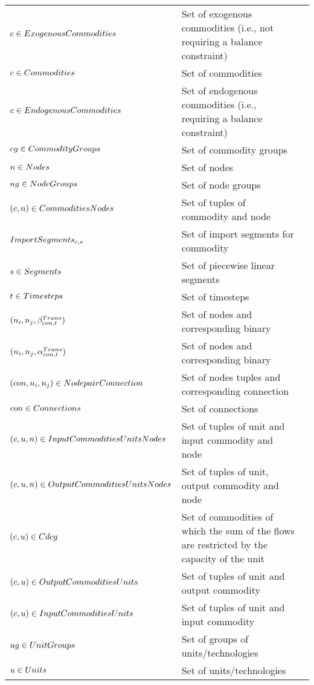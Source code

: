 	\begin{longtable}{p{\cola} p{\colc} >{\small\raggedleft\arraybackslash\itshape}p{\colb}}
		$c \in ExogenousCommodities$	& Set of exogenous commodities (i.e., not requiring a balance constraint)	&                \\
		$c \in Commodities   $	& Set of commodities                                          	&                \\
		$c \in EndogenousCommodities$	& Set of endogenous commodities (i.e., requiring a balance constraint)	&                \\
		$cg \in CommodityGroups$	& Set of commodity groups                                     	&                \\
		$n \in Nodes         $	& Set of nodes                                                	&                \\
		$ng \in NodeGroups    $	& Set of node groups                                          	&                \\
		$(c, n) \in CommoditiesNodes$	& Set of tuples of commodity and node                         	&                \\
		$ImportSegments_{c,s}$	& Set of import segments \segment for commodity \commodity    	&                \\
		$s \in Segments      $	& Set of piecewise linear segments                            	&                \\
		$t \in Timesteps     $	& Set of timesteps                                            	&                \\
		$(n_i,n_j,\beta^{Trans}_{{con},t})       $	& Set of nodes and corresponding binary                       	&                \\
		$(n_i,n_j,\alpha^{Trans}_{{con},t})      $	& Set of nodes and corresponding binary                       	&                \\
		$({con},n_i,n_j) \in NodepairConnection$	& Set of nodes tuples and corresponding connection            	&                \\
		${con} \in Connections   $	& Set of connections                                          	&                \\
		$(c, u, n) \in InputCommoditiesUnitsNodes$	& Set of tuples of unit and input commodity and node          	&                \\
		$(c, u, n) \in OutputCommoditiesUnitsNodes$	& Set of tuples of unit, output commodity and node            	&                \\
		$(c, u) \in Cdcg          $	& Set of commodities of which the sum of the flows are restricted by the capacity of the unit	&                \\
		$(c, u) \in OutputCommoditiesUnits$	& Set of tuples of unit and output commodity                  	&                \\
		$(c, u) \in InputCommoditiesUnits$	& Set of tuples of unit and input commodity                   	&                \\
		$ug \in UnitGroups    $	& Set of groups of units/technologies                         	&                \\
		$u \in Units         $	& Set of units/technologies                                   	&                \\
	\end{longtable}

